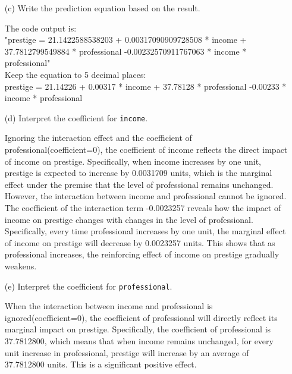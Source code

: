 \documentclass[12pt,letterpaper]{article}
\begin{document}
\begin{enumerate}
\begin{figure}[h!]
	\end{figure}
	\item [(c)]
	Write the prediction equation based on the result.
	
	The code output is:\\
	
	"prestige =  21.1422588538203 + 0.00317090909728508 * income + 37.7812799549884 * professional -0.00232570911767063 * income * professional"\\

	Keep the equation to 5 decimal places:\\

	prestige =  21.14226 + 0.00317 * income + 37.78128 * professional -0.00233 * income * professional\\

	\item [(d)]
	Interpret the coefficient for \texttt{income}.	\vspace{1cm}
	
	Ignoring the interaction effect and the coefficient of professional(coefficient=0), the coefficient of income reflects the direct impact of income on prestige. Specifically, when income increases by one unit, prestige is expected to increase by 0.0031709 units, which is the marginal effect under the premise that the level of professional remains unchanged.\\
	
	However, the interaction between income and professional cannot be ignored. The coefficient of the interaction term -0.0023257 reveals how the impact of income on prestige changes with changes in the level of professional. Specifically, every time professional increases by one unit, the marginal effect of income on prestige will decrease by 0.0023257 units. This shows that as professional increases, the reinforcing effect of income on prestige gradually weakens.\\
	\vspace{1cm}	
	\item [(e)]
	Interpret the coefficient for \texttt{professional}.	\vspace{1cm}
	
	When the interaction between income and professional is ignored(coefficient=0), the coefficient of professional will directly reflect its marginal impact on prestige. Specifically, the coefficient of professional is 37.7812800, which means that when income remains unchanged, for every unit increase in professional, prestige will increase by an average of 37.7812800 units. This is a significant positive effect.\\
	

\end{enumerate}
\end{document}
